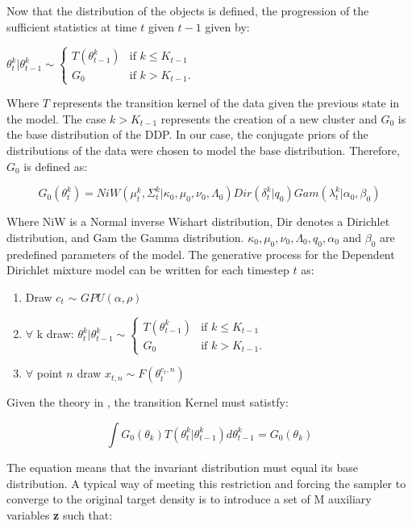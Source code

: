 \documentclass[twoside,hidelinks]{article}
\begin{document}
Now that the distribution of the objects is defined, the progression of the sufficient statistics at time $t$ given $t-1$ given by:

$\theta_t^k | \theta_{t-1}^k \sim
\begin{cases} T (\theta_{t-1}^k) &\mbox{if } k \leq K_{t-1} \\
G_0 & \mbox{if } k > K_{t-1}. \end{cases}$

Where $T$ represents the transition kernel of the data given the previous state in the model. The case $ k > K_{t-1} $ represents the creation of a new cluster and $G_0$ is the base distribution of the DDP. In our case, the conjugate priors of the distributions of the data were chosen to model the base distribution. Therefore, $G_0$ is defined as:

$$ G_0(\theta_t^k)  = NiW( \mu_t^k, \Sigma_t^k | \kappa_0, \mu_0, \nu_0, \Lambda_0 ) Dir(\delta_t^k | q_0) Gam( \lambda_t^k | \alpha_0, \beta_0) $$

Where NiW is a Normal inverse Wishart distribution, Dir denotes a Dirichlet distribution, and Gam the Gamma distribution. $ \kappa_0, \mu_0, \nu_0, \Lambda_0, q_0,\alpha_0$ and $\beta_0$ are predefined parameters of the model. The generative process for the Dependent Dirichlet mixture model can be written for each timestep $t$ as:

\noindent\makebox[\linewidth]{\rule{\textwidth}{0.4pt}}
\begin{enumerate}
	\item Draw  $c_t$ $\sim$ $GPU(\alpha, \rho) $
	\item $\forall$  k draw: $ \theta_t^k | \theta_{t-1}^k \sim
	\begin{cases} T (\theta_{t-1}^k) &\mbox{if } k \leq K_{t-1} \\
	G_0 & \mbox{if } k > K_{t-1}. \end{cases}$
	\item $\forall$  point $n$ draw $ x_{t,n} \sim F(\theta_t^{c_t,n})$
\end{enumerate}
\noindent\makebox[\linewidth]{\rule{\textwidth}{0.4pt}}
Given the theory in \cite{caron}, the transition Kernel must satistfy:

$$ \int G_0(\theta_k) T(\theta_t^k | \theta_{t-1}^k) d\theta_{t-1}^k =  G_0(\theta_k) $$

The equation means that the invariant distribution must equal its base distribution. A typical way of meeting this restriction and forcing the sampler to converge to the original target density\cite{smc:theory} is to introduce a set of M auxiliary variables \textbf{z} such that:
\end{document}
